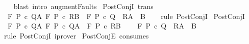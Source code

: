 \begin{isabellebody}
%
\isadelimproof
\ \ %
\endisadelimproof
%
\isatagproof
{}\isamarkupfalse%
\ {\isacharparenleft}blast\ intro{\isacharcolon}\ augment{\isacharunderscore}Faults{\isacharparenright}%
\endisatagproof
{\isafoldproof}%
%
\isadelimproof
\isanewline
%
\endisadelimproof
\isanewline
{}\isamarkupfalse%
\ PostConjI\ {\isacharbrackleft}trans{\isacharbrackright}{\isacharcolon}\isanewline
\ \ {\isachardoublequoteopen}{\isasymlbrakk}{\isasymGamma}{\isacharcomma}{\isasymTheta}{\isasymturnstile}\isactrlbsub {\isacharslash}F\isactrlesub \ P\ c\ Q{\isacharcomma}A{\isacharsemicolon}\ {\isasymGamma}{\isacharcomma}{\isasymTheta}{\isasymturnstile}\isactrlbsub {\isacharslash}F\isactrlesub \ P\ c\ R{\isacharcomma}B{\isasymrbrakk}\ {\isasymLongrightarrow}\ {\isasymGamma}{\isacharcomma}{\isasymTheta}{\isasymturnstile}\isactrlbsub {\isacharslash}F\isactrlesub \ P\ c\ {\isacharparenleft}Q\ {\isasyminter}\ R{\isacharparenright}{\isacharcomma}{\isacharparenleft}A\ {\isasyminter}\ B{\isacharparenright}{\isachardoublequoteclose}\isanewline
%
\isadelimproof
\ \ %
\endisadelimproof
%
\isatagproof
{}\isamarkupfalse%
\ {\isacharparenleft}rule\ PostConjI{\isacharparenright}%
\endisatagproof
{\isafoldproof}%
%
\isadelimproof
\isanewline
%
\endisadelimproof
\isanewline
{}\isamarkupfalse%
\ PostConjI{\isacharprime}\ {\isacharcolon}\isanewline
\ \ {\isachardoublequoteopen}{\isasymlbrakk}{\isasymGamma}{\isacharcomma}{\isasymTheta}{\isasymturnstile}\isactrlbsub {\isacharslash}F\isactrlesub \ P\ c\ Q{\isacharcomma}A{\isacharsemicolon}\ {\isasymGamma}{\isacharcomma}{\isasymTheta}{\isasymturnstile}\isactrlbsub {\isacharslash}F\isactrlesub \ P\ c\ Q{\isacharcomma}A\ {\isasymLongrightarrow}\ {\isasymGamma}{\isacharcomma}{\isasymTheta}{\isasymturnstile}\isactrlbsub {\isacharslash}F\isactrlesub \ P\ c\ R{\isacharcomma}B{\isasymrbrakk}\ \isanewline
\ \ {\isasymLongrightarrow}\ {\isasymGamma}{\isacharcomma}{\isasymTheta}{\isasymturnstile}\isactrlbsub {\isacharslash}F\isactrlesub \ P\ c\ {\isacharparenleft}Q\ {\isasyminter}\ R{\isacharparenright}{\isacharcomma}{\isacharparenleft}A\ {\isasyminter}\ B{\isacharparenright}{\isachardoublequoteclose}\isanewline
%
\isadelimproof
\ \ %
\endisadelimproof
%
\isatagproof
{}\isamarkupfalse%
\ {\isacharparenleft}rule\ PostConjI{\isacharparenright}\ iprover{\isacharplus}%
\endisatagproof
{\isafoldproof}%
%
\isadelimproof
\isanewline
%
\endisadelimproof
\isanewline
{}\isamarkupfalse%
\ PostConjE\ {\isacharbrackleft}consumes\ {}{\isacharbrackright}{\isacharcolon}\ \isanewline

\end{isabellebody}
